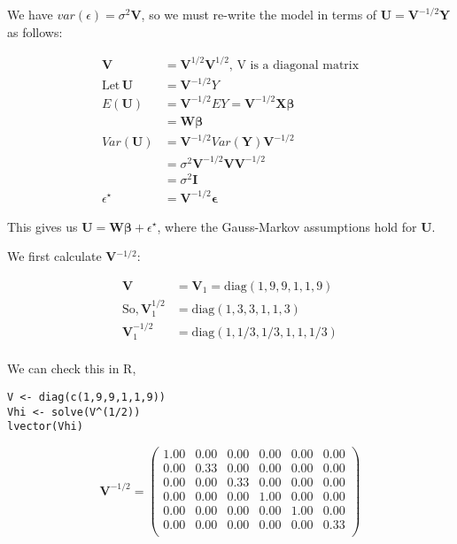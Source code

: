 \documentclass[11pt]{article}
\begin{document}
We have $var(\epsilon) = \sigma^2 \mathbf{V}$, so we must re-write
the model in terms of $\mathbf{U} = \mathbf{V}^{-1/2}\mathbf{Y}$ as
follows:

\begin{align*}
\mathbf{V} &= \mathbf{V}^{1/2} \mathbf{V}^{1/2},\, \text{V is a
diagonal matrix}\\
\mathrm{Let }\, \mathbf{U}& =\mathbf{V}^{-1/2}Y\\ E(\mathbf{U}) &= \mathbf{V}^{-1/2}E{Y} = \mathbf{V}^{-1/2}\mathbf{X\beta}\\
&= \mathbf{W\beta}\\
Var(\mathbf{U}) &= \mathbf{V}^{-1/2} Var(\mathbf{Y})\mathbf{V}^{-1/2}\\
                &= \sigma^2 \mathbf{V}^{-1/2} \mathbf{V}\mathbf{V}^{-1/2}\\
                &= \sigma^2 \mathbf{I}\\
\epsilon^{\star} &= \mathbf{V}^{-1/2} \mathbf{\epsilon}
\end{align*}

This gives us $\mathbf{U} = \mathbf{W\beta} + \epsilon^{\star}$, where
the Gauss-Markov assumptions hold for \textbf{U}.

We first calculate \textbf{V$^{\mathrm{-1/2}}$}:

\begin{align*}
\mathbf{V} &= \mathbf{V}_1 = \mathrm{diag}(1,9,9,1,1,9)\\
\text{So,}\, \mathbf{V}^{1/2}_1 &= \mathrm{diag}(1,3,3,1,1,3)\\
             \mathbf{V}^{-1/2}_1 &= \mathrm{diag}(1,1/3,1/3,1,1,1/3)\\
\end{align*}

We can check this in R,

\begin{verbatim}
V <- diag(c(1,9,9,1,1,9))
Vhi <- solve(V^(1/2))
lvector(Vhi)
\end{verbatim}

\[
\mathbf{V}^{-1/2} = 
\begin{pmatrix}{}
  1.00 & 0.00 & 0.00 & 0.00 & 0.00 & 0.00 \\ 
  0.00 & 0.33 & 0.00 & 0.00 & 0.00 & 0.00 \\ 
  0.00 & 0.00 & 0.33 & 0.00 & 0.00 & 0.00 \\ 
  0.00 & 0.00 & 0.00 & 1.00 & 0.00 & 0.00 \\ 
  0.00 & 0.00 & 0.00 & 0.00 & 1.00 & 0.00 \\ 
  0.00 & 0.00 & 0.00 & 0.00 & 0.00 & 0.33 \\ 
  \end{pmatrix}
\]
\end{document}
